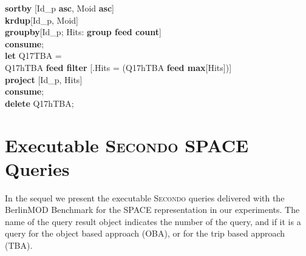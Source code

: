 \documentclass[a4paper]{article}
\newcommand{\secondo}{\textsc{Secondo}}
\newcommand{\bmodb} {BerlinMOD Benchmark}
\newcommand{\op}[1]{\textbf{#1}}
\begin{document}
\begin{scriptsize}
\begin{tabbing}
\>\op{sortby} [Id\_p \op{asc}, Moid \op{asc}]\\
\>\op{krdup}[Id\_p, Moid]\\
\>\op{groupby}[Id\_p; Hits: \op{group feed count}]\\
\op{consume};\\
\op{let} Q17TBA =\\
\>Q17hTBA \op{feed filter} [.Hits = (Q17hTBA \op{feed max}[Hits])]\\
\>\op{project} [Id\_p, Hits]\\
\op{consume};\\
\op{delete} Q17hTBA;\\
\end{tabbing}
\end{scriptsize}
\section{Executable \secondo{} SPACE Queries}
In the sequel we present the executable \secondo{} queries delivered with the
\bmodb{} for the SPACE representation in our experiments.
The name of the query result object indicates the number of
the query, and if it is a query for the object based approach (OBA), or for the
trip based approach (TBA).
\end{document}
